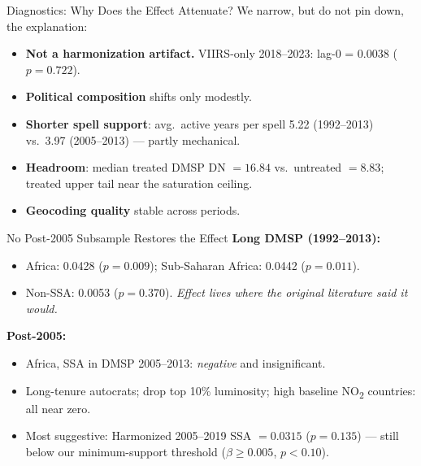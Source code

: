 \documentclass[10pt,aspectratio=169]{beamer}
\begin{document}
\begin{frame}{Diagnostics: Why Does the Effect Attenuate?}
We narrow, but do not pin down, the explanation:
\begin{itemize}
  \item \textbf{Not a harmonization artifact.} VIIRS-only 2018--2023: lag-0 = 0.0038 ($p=0.722$).
  \item \textbf{Political composition} shifts only modestly.
  \item \textbf{Shorter spell support}: avg.\ active years per spell 5.22 (1992--2013) vs.\ 3.97 (2005--2013) --- partly mechanical.
  \item \textbf{Headroom}: median treated DMSP DN $=16.84$ vs.\ untreated $=8.83$; treated upper tail near the saturation ceiling.
  \item \textbf{Geocoding quality} stable across periods.
\end{itemize}
\end{frame}

\begin{frame}{No Post-2005 Subsample Restores the Effect}
\textbf{Long DMSP (1992--2013):}
\begin{itemize}
  \item Africa: 0.0428 ($p=0.009$); Sub-Saharan Africa: 0.0442 ($p=0.011$).
  \item Non-SSA: 0.0053 ($p=0.370$). \emph{Effect lives where the original literature said it would.}
\end{itemize}

\vspace{0.3em}
\textbf{Post-2005:}
\begin{itemize}
  \item Africa, SSA in DMSP 2005--2013: \textit{negative} and insignificant.
  \item Long-tenure autocrats; drop top 10\% luminosity; high baseline NO\textsubscript{2} countries: all near zero.
  \item Most suggestive: Harmonized 2005--2019 SSA $=0.0315$ ($p=0.135$) --- still below our minimum-support threshold ($\beta\geq 0.005$, $p<0.10$).
\end{itemize}
\end{frame}
\end{document}
